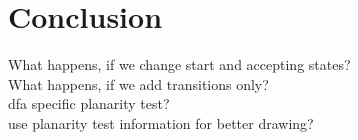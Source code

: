 \chapter{Conclusion}

What happens, if we change start and accepting states? \\
What happens, if we add transitions only? \\

\noindent dfa specific planarity test? \\
use planarity test information for better drawing?